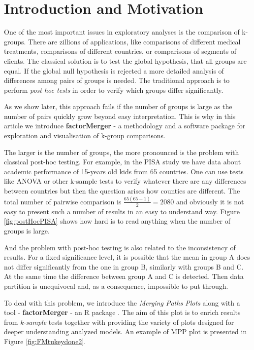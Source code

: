 \documentclass[12pt]{article}
\begin{document}
\newpage
{} %
\section{Introduction and Motivation}
\label{sec:intro}
One of the most important issues in exploratory analyses is the comparison of k-groups. There are zillions of applications, like comparisons of different medical treatments, comparisons of different countries, or comparisons of segments of clients. The classical solution is to test the global hypothesis, that all groups are equal. 
If the global null hypothesis is rejected a more detailed analysis of differences among pairs of groups is needed. The traditional approach is to perform \emph{post hoc tests} in order to verify which groups differ significantly. 

As we show later, this approach fails if the number of groups is large as the number of pairs quickly grow beyond easy interpretation.  This is why in this article we introduce \textbf{factorMerger} - a methodology and a software package for exploration and visualisation of k-group comparisons. 

The larger is the number of groups, the more pronounced is the problem with classical post-hoc testing. 
For example, in the PISA study \citep{pisa2012} we have data about academic performance of 15-years old kids from 65 countries. One can use tests like ANOVA or other k-sample tests to verify whatever there are any differences between countries but then the question arises how counties are different. The total number of pairwise comparison is $\frac{65(65-1)}{2}=2080$ and obviously it is not easy to present such a number of results in an easy to understand way. Figure \ref{fig:postHocPISA} shows how hard is to read anything when the number of groups is large.

And the problem with post-hoc testing is also related to the inconsistency of results. For a fixed significance level, it is possible that the mean in group A does not differ significantly from the one in group B, similarly with groups B and C. At the same time the difference between group A and C is detected. Then data partition is unequivocal and, as a consequence, impossible to put through. 

To deal with this problem, we introduce the \emph{Merging Paths Plots} along with a tool - \textbf{factorMerger} - an R package \citep{Rcran}. The aim of this plot is to enrich results from \emph{k-sample} tests together with providing the variety of plots designed for deeper understanding analyzed models. 
An example of MPP plot is presented in Figure \ref{fig:FMtukeydone2}.
\end{document}

